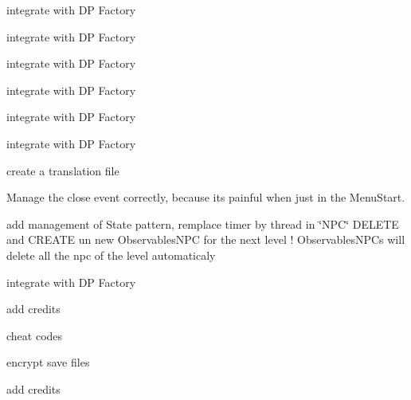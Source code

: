 
\begin{DoxyRefList}
\item[\label{todo__todo000001}%
\hypertarget{todo__todo000001}{}%
Class \hyperlink{class_b___movable}{B\+\_\+\+Movable} ]integrate with D\+P Factory  
\item[\label{todo__todo000002}%
\hypertarget{todo__todo000002}{}%
Class \hyperlink{class_b___wall}{B\+\_\+\+Wall} ]integrate with D\+P Factory  
\item[\label{todo__todo000003}%
\hypertarget{todo__todo000003}{}%
Class \hyperlink{class_b___water}{B\+\_\+\+Water} ]integrate with D\+P Factory  
\item[\label{todo__todo000004}%
\hypertarget{todo__todo000004}{}%
Class \hyperlink{class_c___enemy}{C\+\_\+\+Enemy} ]integrate with D\+P Factory  
\item[\label{todo__todo000005}%
\hypertarget{todo__todo000005}{}%
Class \hyperlink{class_e___fox}{E\+\_\+\+Fox} ]integrate with D\+P Factory  
\item[\label{todo__todo000006}%
\hypertarget{todo__todo000006}{}%
Class \hyperlink{class_e___wolf}{E\+\_\+\+Wolf} ]integrate with D\+P Factory  
\item[\label{todo__todo000008}%
\hypertarget{todo__todo000008}{}%
Class \hyperlink{class_g___gameboard}{G\+\_\+\+Gameboard} ]create a translation file  
\item[\label{todo__todo000010}%
\hypertarget{todo__todo000010}{}%
Class \hyperlink{class_g___main_game}{G\+\_\+\+Main\+Game} ]Manage the close event correctly, because it\textquotesingle{}s painful when just in the Menu\+Start.  
\item[\label{todo__todo000011}%
\hypertarget{todo__todo000011}{}%
Class \hyperlink{class_observer___n_p_c}{Observer\+\_\+\+N\+P\+C} ]add management of State pattern, remplace timer by thread in \char`\"{}\+N\+P\+C\char`\"{}  D\+E\+L\+E\+T\+E and C\+R\+E\+A\+T\+E un new Observables\+N\+P\+C for the next level ! Observables\+N\+P\+Cs will delete all the npc of the level automaticaly  
\item[\label{todo__todo000007}%
\hypertarget{todo__todo000007}{}%
Class \hyperlink{struct_sliding_block}{Sliding\+Block} ]integrate with D\+P Factory  
\item[\label{todo__todo000012}%
\hypertarget{todo__todo000012}{}%
Class \hyperlink{class_w___menu_pause}{W\+\_\+\+Menu\+Pause} ]add credits 

cheat codes  
\item[\label{todo__todo000013}%
\hypertarget{todo__todo000013}{}%
Class \hyperlink{class_w___menu_start}{W\+\_\+\+Menu\+Start} ]encrypt save files 

add credits 
\end{DoxyRefList}